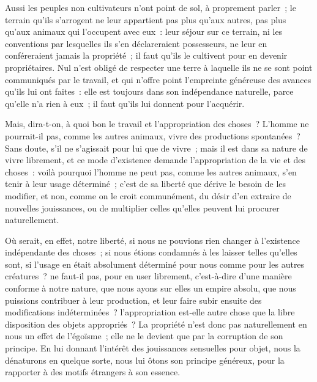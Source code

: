 \documentclass[french,twoside]{book} %
\begin{document}
Aussi les peuples non cultivateurs n’ont point de sol, à proprement parler ; le terrain qu’ils s’arrogent ne leur appartient pas plus qu’aux autres, pas plus qu’aux animaux qui l’occupent avec eux : leur séjour sur ce terrain, ni les conventions par lesquelles ils s’en déclareraient possesseurs, ne leur en conféreraient jamais la propriété ; il faut qu’ils le cultivent pour en devenir propriétaires. Nul n’est obligé de respecter une terre à laquelle ils ne se sont point communiqués par le travail, et qui n’offre point l’empreinte généreuse des avances qu’ils lui ont faites : elle est toujours dans son indépendance naturelle, parce qu’elle n’a rien à eux ; il faut qu’ils lui donnent pour l’acquérir.\par
Mais, dira-t-on, à quoi bon le travail et l’appropriation des choses ? L’homme ne pourrait-il pas, comme les autres animaux, vivre des productions spontanées ? Sans doute, s’il ne s’agissait pour lui que de vivre ; mais il est dans sa nature de vivre librement, et ce mode d’existence demande l’appropriation de la vie et des choses : voilà pourquoi l’homme ne peut pas, comme les autres animaux, s’en tenir à leur usage déterminé ; c’est de sa liberté que dérive le besoin de les modifier, et non, comme on le croit communément, du désir d’en extraire de nouvelles jouissances, ou de multiplier celles qu’elles peuvent lui procurer naturellement.\par
Où serait, en effet, notre liberté, si nous ne pouvions rien changer à l’existence indépendante des choses ; si nous étions condamnés à les laisser telles qu’elles sont, si l’usage en était absolument déterminé pour nous comme pour les autres créatures ? ne faut-il pas, pour en user librement, c’est-à-dire d’une manière conforme à notre nature, que nous ayons sur elles un empire absolu, que nous puissions contribuer à leur production, et leur faire subir ensuite des modifications indéterminées ? l’appropriation est-elle autre chose que la libre disposition des objets appropriés ? La propriété n’est donc pas naturellement en nous un effet de l’égoïsme ; elle ne le devient que par la corruption de son principe. En lui donnant l’intérêt des jouissances sensuelles pour objet, nous la dénaturons en quelque sorte, nous lui ôtons son principe généreux, pour la rapporter à des motifs étrangers à son essence.\par
\end{document}
